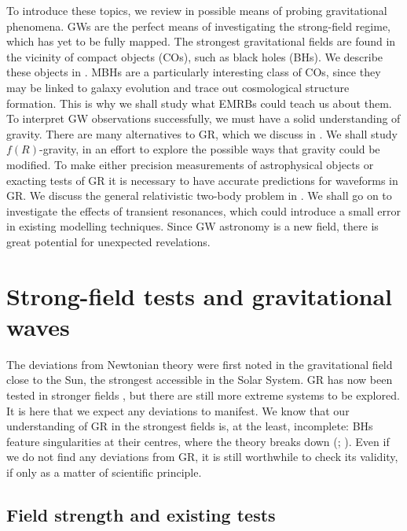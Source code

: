 To introduce these topics, we review in  possible means of probing gravitational phenomena. GWs are the perfect means of investigating the strong-field regime, which has yet to be fully mapped. The strongest gravitational fields are found in the vicinity of compact objects (COs), such as black holes (BHs). We describe these objects in . MBHs are a particularly interesting class of COs, since they may be linked to galaxy evolution and trace out cosmological structure formation. This is why we shall study what EMRBs could teach us about them. To interpret GW observations successfully, we must have a solid understanding of gravity. There are many alternatives to GR, which we discuss in . We shall study $f(R)$-gravity, in an effort to explore the possible ways that gravity could be modified. To make either precision measurements of astrophysical objects or exacting tests of GR it is necessary to have accurate predictions for waveforms in GR. We discuss the general relativistic two-body problem in . We shall go on to investigate the effects of transient resonances, which could introduce a small error in existing modelling techniques. Since GW astronomy is a new field, there is great potential for unexpected revelations.

\section{Strong-field tests and gravitational waves}\label{sec:strong-field}

The deviations from Newtonian theory were first noted in the gravitational field close to the Sun, the strongest accessible in the Solar System. GR has now been tested in stronger fields \citep{Will2006}, but there are still more extreme systems to be explored. It is here that we expect any deviations to manifest. We know that our understanding of GR in the strongest fields is, at the least, incomplete: BHs feature singularities at their centres, where the theory breaks down (\citealt[section 34.6]{Misner1973}; \citealt[chapter 9]{Wald1984}). Even if we do not find any deviations from GR, it is still worthwhile to check its validity, if only as a matter of scientific principle.

\subsection{Field strength and existing tests}\label{sec:exist-tests}

